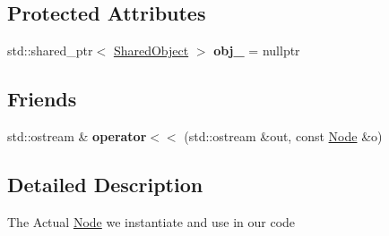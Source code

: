 \subsection*{Protected Attributes}
\begin{DoxyCompactItemize}
\item 
\hypertarget{classs9_1_1Node_a155dd98568768de1ffa56b640f9f1c25}{std\-::shared\-\_\-ptr$<$ \hyperlink{structs9_1_1Node_1_1SharedObject}{Shared\-Object} $>$ {\bfseries obj\-\_\-} = nullptr}\label{classs9_1_1Node_a155dd98568768de1ffa56b640f9f1c25}

\end{DoxyCompactItemize}
\subsection*{Friends}
\begin{DoxyCompactItemize}
\item 
\hypertarget{classs9_1_1Node_a665cafb946fe352747ef888b5d1004c2}{std\-::ostream \& {\bfseries operator$<$$<$} (std\-::ostream \&out, const \hyperlink{classs9_1_1Node}{Node} \&o)}\label{classs9_1_1Node_a665cafb946fe352747ef888b5d1004c2}

\end{DoxyCompactItemize}


\subsection{Detailed Description}
The Actual \hyperlink{classs9_1_1Node}{Node} we instantiate and use in our code 

